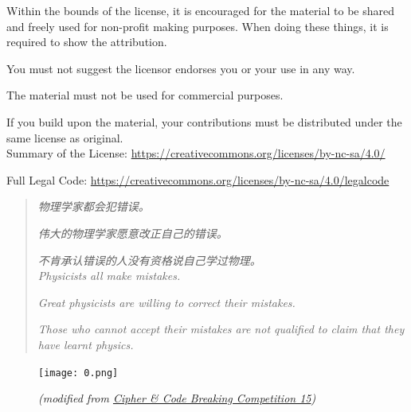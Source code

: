 \documentclass[10pt,a4paper,onecolumn,UTF8]{ctexart}
\begin{document}
	Within the bounds of the license, it is encouraged for the material to be shared and freely used for non-profit making purposes. When doing these things, it is required to show the attribution.
	
	You must not suggest the licensor endorses you or your use in any way.
	
	The material must not be used for commercial purposes.
	
	If you build upon the material, your contributions must be distributed under the same license as original.\\[5ex]
	
	Summary of the License: \href{https://creativecommons.org/licenses/by-nc-sa/4.0/}{https://creativecommons.org/licenses/by-nc-sa/4.0/}
	
	Full Legal Code: \href{https://creativecommons.org/licenses/by-nc-sa/4.0/legalcode}{https://creativecommons.org/licenses/by-nc-sa/4.0/legalcode}\\[5ex]
	
	\newpage
	\thispagestyle{empty}
	
	\vspace*{\fill}
	\begin{quotation}
		
		\textit{物理学家都会犯错误。}
		
		\textit{伟大的物理学家愿意改正自己的错误。}
		
		\textit{不肯承认错误的人没有资格说自己学过物理。}\\[2ex]
		
		
		\textit{Physicists all make mistakes.}
		
		\textit{Great physicists are willing to correct their mistakes.}
		
		\textit{Those who cannot accept their mistakes are not qualified to claim that they have learnt physics.}\\[6ex]
		
	\end{quotation}
	
	\begin{figure}[!bh]
		\centering
		\texttt{[image: 0.png]}
		
		\small{\textit{(modified from \href{https://ccbc15.cipherpuzzles.com/info/about}{Cipher \& Code Breaking Competition 15})}}
	\end{figure}
	\vspace*{\fill}
	
	
	\setcounter{page}{0}
	
	\newpage
	
\end{document}

